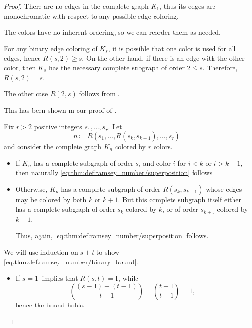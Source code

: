 \begin{proof}
   There are no edges in the complete graph \( K_1 \), thus its edges are monochromatic with respect to any possible edge coloring.

   The colors have no inherent ordering, so we can reorder them as needed.

   For any binary edge coloring of \( K_s \), it is possible that one color is used for all edges, hence \( R(s, 2) \geq s \). On the other hand, if there is an edge with the other color, then \( K_s \) has the necessary complete subgraph of order \( 2 \leq s \). Therefore, \( R(s, 2) = s \).

  The other case \( R(2, s) \) follows from .

   This has been shown in our proof of .

   Fix \( r > 2 \) positive integers \( s_1, \ldots, s_r \). Let
  \begin{equation*}
    n \coloneqq R(s_1, \ldots, R(s_k, s_{k+1}), \ldots, s_r)
  \end{equation*}
  and consider the complete graph \( K_n \) colored by \( r \) colors.

  \begin{itemize}
    \item If \( K_n \) has a complete subgraph of order \( s_i \) and color \( i \) for \( i < k \) or \( i > k + 1 \), then naturally \eqref{eq:thm:def:ramsey_number/superposition} follows.

    \item Otherwise, \( K_n \) has a complete subgraph of order \( R(s_k, s_{k+1}) \) whose edges may be colored by both \( k \) or \( k + 1 \). But this complete subgraph itself either has a complete subgraph of order \( s_k \) colored by \( k \), or of order \( s_{k+1} \) colored by \( k + 1 \).

    Thus, again, \eqref{eq:thm:def:ramsey_number/superposition} follows.
  \end{itemize}

   We will use induction on \( s + t \) to show \eqref{eq:thm:def:ramsey_number/binary_bound}.
  \begin{itemize}
    \item If \( s = 1 \),  implies that \( R(s, t) = 1 \), while
    \begin{equation*}
      \binom { (s - 1) + (t - 1) } {t - 1} = \binom { t - 1 } { t - 1 } = 1,
    \end{equation*}
    hence the bound holds.


\end{itemize}
\end{proof}
